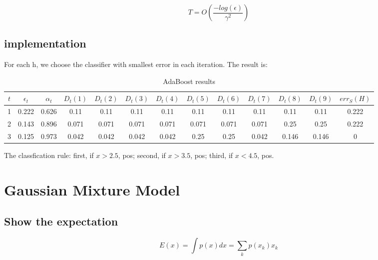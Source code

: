 \documentclass{article} %
\begin{document}
\begin{equation}
T = O (\frac{-log (\epsilon)}{\gamma^2})
\end{equation}


\subsection{implementation}
For each h, we choose the classifier with smallest error in each
iteration. The result is:

\begin{table}[h]
\renewcommand{\arraystretch}{1.5}
\centering
\begin{tabular}{|c|c|c|c|c|c|c|c|c|c|c|c|c|}
\hline 
$ t $ 
& $ \epsilon_t $ 
& $ \alpha_t $ 
& $ D_t(1) $ 
& $ D_t(2) $ 
& $ D_t(3) $
& $ D_t(4) $
& $ D_t(5) $
& $ D_t(6) $
& $ D_t(7) $
& $ D_t(8) $
& $ D_t(9) $ 
& $ err_S(H) $ \\
\hline 
1 &0.222 &0.626 &0.11 &0.11 &0.11 &0.11 &0.11
&0.11 &0.11 &0.11 &0.11 &0.222 \\
\hline 
2 &0.143 &0.896 &0.071 &0.071 &0.071 &0.071 &0.071
&0.071 &0.071 &0.25 &0.25 &0.222 \\
\hline 
3 &0.125 &0.973 &0.042 &0.042 &0.042 &0.042 &0.25
&0.25 &0.042 &0.146 &0.146 &0 \\
\hline 
\end{tabular}
\caption{AdaBoost results}
\label{tbl:boost}
\end{table}

The classfication rule: first, if $x > 2.5$, pos; second, if $x > 3.5$,
pos; third, if $x < 4.5$, pos.


















\section{Gaussian Mixture Model}


\subsection{Show the expectation}
\begin{equation}
E (x) = \int p(x) dx = \sum_k p(x_k) x_k
\end{equation}
\end{document}
